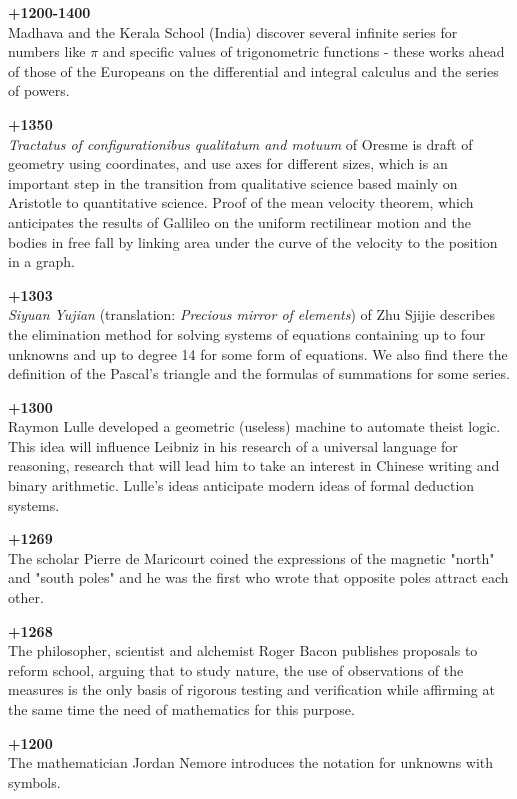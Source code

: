 \textbf{+1200-1400}\\
Madhava and the Kerala School (India) discover several infinite series for numbers like $\pi$ and specific values of trigonometric functions - these works ahead of those of the Europeans on the differential and integral calculus and the series of powers.

\textbf{+1350}\\
\textit{Tractatus of configurationibus qualitatum and motuum} of Oresme is draft of geometry using coordinates, and use axes for different sizes, which is an important step in the transition from qualitative science based mainly on Aristotle to quantitative science. Proof of the mean velocity theorem, which anticipates the results of Gallileo on the uniform rectilinear motion and the bodies in free fall by linking area under the curve of the velocity to the position in a graph.

\textbf{+1303}\\
\textit{Siyuan Yujian }(translation:\textit{ Precious mirror of elements}) of Zhu Sjijie describes the elimination method for solving systems of equations containing up to four unknowns and up to degree 14 for some form of equations. We also find there the definition of the Pascal's triangle and the formulas of summations for some series.

\textbf{+1300}\\
Raymon Lulle developed a geometric (useless) machine to automate theist logic. This idea will influence Leibniz in his research of a universal language for reasoning, research that will lead him to take an interest in Chinese writing and binary arithmetic. Lulle's ideas anticipate modern ideas of formal deduction systems.

\textbf{+1269}\\
The scholar Pierre de Maricourt coined the expressions of the magnetic "north" and "south poles" and he was the first who wrote that opposite poles attract each other.

\textbf{+1268}\\
The philosopher, scientist and alchemist Roger Bacon publishes proposals to reform school, arguing that to study nature, the use of observations of the measures is the only basis of rigorous testing and verification while affirming at the same time the need of mathematics for this purpose.

\textbf{+1200}\\
The mathematician Jordan Nemore introduces the notation for unknowns with symbols.


